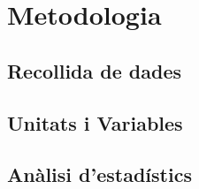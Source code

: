 \section{Metodologia}

\subsection{Recollida de dades}

\subsection{Unitats i Variables}

\subsection{Anàlisi d'estadístics}